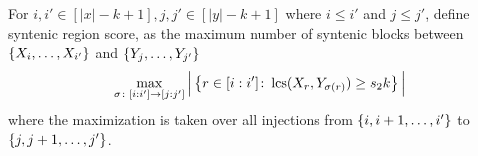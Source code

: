 For $i,i'\in[|x|-k+1], j,j'\in[|y|-k+1]$ where $i\le i'$ and $j\le j'$, define syntenic region score, as the maximum number of syntenic blocks between $\left\{X_i,\dots, X_{i'}\right\}$ and $\left\{Y_j,\dots, Y_{j'}\right\}$
 \begin{align}
    \max_{\sigma\colon [i:i']\to[j:j']}\Big|\left\{r\in [i:i']\colon \operatorname{\mathrm{lcs}}(X_r,Y_{\sigma(r)})\ge s_2 k\right\} \Big|
 \end{align}
where the maximization is taken over all injections from $\left\{i,i+1,\dots, i'\right\}$ to $\left\{j,j+1,\dots, j'\right\}$. 
